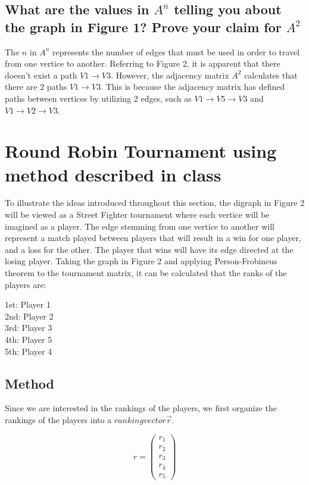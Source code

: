 \documentclass[12pt]{scrreprt}
\begin{document}
\subsection{What are the values in $A^n$ telling you about the graph in Figure 1? Prove your claim for $A^2$}

The $n$ in $A^n$ represents the number of edges that must be used in order to travel from one vertice to another.
Referring to Figure 2, it is apparent that there doesn't exist a path $V1 \rightarrow V3$. However, the adjacency matrix $A^2$
calculates that there are 2 paths $V1 \rightarrow V3$. This is because the adjacency matrix has defined paths between vertices
by utilizing 2 edges, such as $V1 \rightarrow V5 \rightarrow V3$ and $V1 \rightarrow V2 \rightarrow V3$.

\section{Round Robin Tournament using method described in class}

To illustrate the ideas introduced throughout this section, the digraph in Figure 2 will be viewed as a Street Fighter tournament where each
vertice will be imagined as a player. The edge stemming from one vertice to another will represent a match played between players
that will result in a win for one player, and a loss for the other. The player that wins will have its edge directed at the losing player.
Taking the graph in Figure 2 and applying Person-Frobineus theorem to the tournament matrix, it can be calculated that the ranks of the players are:

\begin{center}
	1st: Player 1 \\
	2nd: Player 2 \\
	3rd: Player 3 \\
	4th: Player 5 \\
	5th: Player 4 \\
\end{center}

\subsection{Method}

Since we are interested in the rankings of the players, we first organize the rankings of the players into a $ranking vector \vec{r}$.

\[ r = \begin{pmatrix}r_1\\r_2\\r_3\\r_4\\r_5\end{pmatrix} \]
\end{document}
